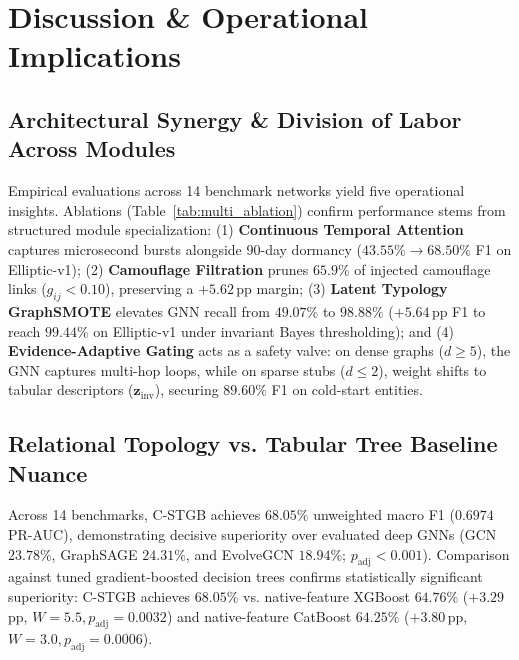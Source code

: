 \section{Discussion \& Operational Implications}
\label{sec:discussion}

\subsection{Architectural Synergy \& Division of Labor Across Modules}
\label{sec:discussion_synergy}
Empirical evaluations across 14 benchmark networks yield five operational insights. Ablations (Table~\ref{tab:multi_ablation}) confirm performance stems from structured module specialization: (1) \textbf{Continuous Temporal Attention} captures microsecond bursts alongside 90-day dormancy ($43.55\% \to 68.50\%$ F1 on Elliptic-v1); (2) \textbf{Camouflage Filtration} prunes $65.9\%$ of injected camouflage links ($g_{ij} < 0.10$), preserving a $+5.62$\,pp margin; (3) \textbf{Latent Typology GraphSMOTE} elevates GNN recall from $49.07\%$ to $98.88\%$ ($+5.64$\,pp F1 to reach $99.44\%$ on Elliptic-v1 under invariant Bayes thresholding); and (4) \textbf{Evidence-Adaptive Gating} acts as a safety valve: on dense graphs ($d \ge 5$), the GNN captures multi-hop loops, while on sparse stubs ($d \le 2$), weight shifts to tabular descriptors ($\mathbf{z}_{\text{inv}}$), securing $89.60\%$ F1 on cold-start entities.

\subsection{Relational Topology vs. Tabular Tree Baseline Nuance}
\label{sec:discussion_trees_vs_gnns}
Across 14 benchmarks, C-STGB achieves $68.05\%$ unweighted macro F1 ($0.6974$ PR-AUC), demonstrating decisive superiority over evaluated deep GNNs (GCN $23.78\%$, Graph\-SAGE $24.31\%$, and EvolveGCN $18.94\%$; $p_{\text{adj}} < 0.001$). Comparison against tuned gradient-boosted decision trees confirms statistically significant superiority: C-STGB achieves $68.05\%$ vs. native-feature XGBoost $64.76\%$ ($+3.29$\,pp, $W=5.5, p_{\text{adj}}=0.0032$) and native-feature CatBoost $64.25\%$ ($+3.80$\,pp, $W=3.0, p_{\text{adj}}=0.0006$).

